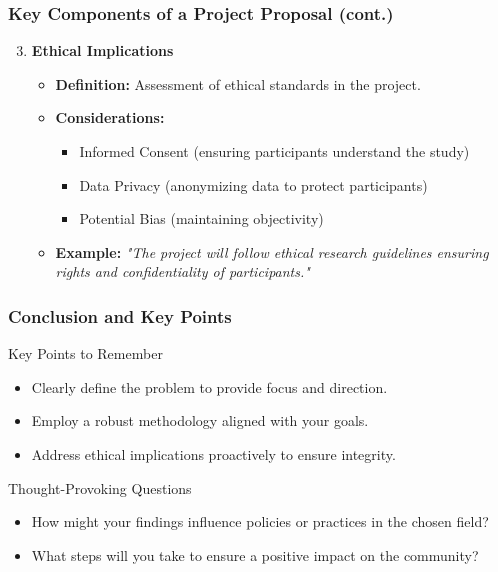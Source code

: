 \documentclass[aspectratio=169]{beamer}
\begin{document}
\begin{frame}[fragile]
    \frametitle{Key Components of a Project Proposal (cont.)}
    \begin{enumerate}
        \setcounter{enumi}{2}
        \item \textbf{Ethical Implications}
        \begin{itemize}
            \item \textbf{Definition:} Assessment of ethical standards in the project.
            \item \textbf{Considerations:}
            \begin{itemize}
                \item Informed Consent (ensuring participants understand the study)
                \item Data Privacy (anonymizing data to protect participants)
                \item Potential Bias (maintaining objectivity)
            \end{itemize}
            \item \textbf{Example:} \textit{"The project will follow ethical research guidelines ensuring rights and confidentiality of participants."}
        \end{itemize}
    \end{enumerate}
\end{frame}

\begin{frame}[fragile]
    \frametitle{Conclusion and Key Points}
    \begin{block}{Key Points to Remember}
        \begin{itemize}
            \item Clearly define the problem to provide focus and direction.
            \item Employ a robust methodology aligned with your goals.
            \item Address ethical implications proactively to ensure integrity.
        \end{itemize}
    \end{block}
    
    \begin{block}{Thought-Provoking Questions}
        \begin{itemize}
            \item How might your findings influence policies or practices in the chosen field?
            \item What steps will you take to ensure a positive impact on the community?
        \end{itemize}
    \end{block}
\end{frame}
\end{document}
